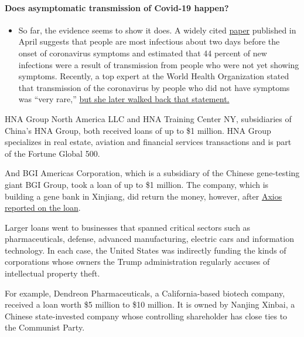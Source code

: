 \begin{itemize}
{  \paragraph{Does asymptomatic transmission of Covid-19
  happen?}\label{does-asymptomatic-transmission-of-covid-19-happen}}

  \begin{itemize}
  \tightlist
  \item
    So far, the evidence seems to show it does. A widely cited
    \href{https://www.nature.com/articles/s41591-020-0869-5}{paper}
    published in April suggests that people are most infectious about
    two days before the onset of coronavirus symptoms and estimated that
    44 percent of new infections were a result of transmission from
    people who were not yet showing symptoms. Recently, a top expert at
    the World Health Organization stated that transmission of the
    coronavirus by people who did not have symptoms was ``very rare,''
    \href{https://www.nytimes3xbfgragh.onion/2020/06/09/world/coronavirus-updates.html?action=click\&pgtype=Article\&state=default\&region=MAIN_CONTENT_3\&context=storylines_faq\#link-1f302e21}{but
    she later walked back that statement.}
  \end{itemize}
\end{itemize}

HNA Group North America LLC and HNA Training Center NY, subsidiaries of
China's HNA Group, both received loans of up to \$1 million. HNA Group
specializes in real estate, aviation and financial services transactions
and is part of the Fortune Global 500.

And BGI Americas Corporation, which is a subsidiary of the Chinese
gene-testing giant BGI Group, took a loan of up to \$1 million. The
company, which is building a gene bank in Xinjiang, did return the
money, however, after
\href{https://www.axios.com/chinese-biotech-us-subsidiary-ppp-loan-8134a863-3779-46c4-9190-ceca54ba00ca.html}{Axios
reported on the loan}.

Larger loans went to businesses that spanned critical sectors such as
pharmaceuticals, defense, advanced manufacturing, electric cars and
information technology. In each case, the United States was indirectly
funding the kinds of corporations whose owners the Trump administration
regularly accuses of intellectual property theft.

For example, Dendreon Pharmaceuticals, a California-based biotech
company, received a loan worth \$5 million to \$10 million. It is owned
by Nanjing Xinbai, a Chinese state-invested company whose controlling
shareholder has close ties to the Communist Party.

